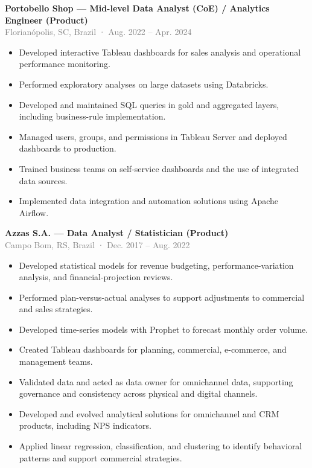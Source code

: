 \documentclass[10pt,a4paper]{article}
\newcommand{\role}[3]{%
  \Needspace{13\baselineskip}%
  \textbf{#1}\\[-1pt]
  {\small\textcolor{grey}{#2}}\\[-1pt]
  #3\par}
\begin{document}
\role{Portobello Shop — Mid-level Data Analyst (CoE) / Analytics Engineer (Product)}{Florianópolis, SC, Brazil · Aug. 2022 – Apr. 2024}{
\begin{itemize}
  \item Developed interactive Tableau dashboards for sales analysis and operational performance monitoring.
  \item Performed exploratory analyses on large datasets using Databricks.
  \item Developed and maintained SQL queries in gold and aggregated layers, including business-rule implementation.
  \item Managed users, groups, and permissions in Tableau Server and deployed dashboards to production.
  \item Trained business teams on self-service dashboards and the use of integrated data sources.
  \item Implemented data integration and automation solutions using Apache Airflow.
\end{itemize}}

\role{Azzas S.A. — Data Analyst / Statistician (Product)}{Campo Bom, RS, Brazil · Dec. 2017 – Aug. 2022}{
\begin{itemize}
  \item Developed statistical models for revenue budgeting, performance-variation analysis, and financial-projection reviews.
  \item Performed plan-versus-actual analyses to support adjustments to commercial and sales strategies.
  \item Developed time-series models with Prophet to forecast monthly order volume.
  \item Created Tableau dashboards for planning, commercial, e-commerce, and management teams.
  \item Validated data and acted as data owner for omnichannel data, supporting governance and consistency across physical and digital channels.
  \item Developed and evolved analytical solutions for omnichannel and CRM products, including NPS indicators.
  \item Applied linear regression, classification, and clustering to identify behavioral patterns and support commercial strategies.
\end{itemize}}
\end{document}
